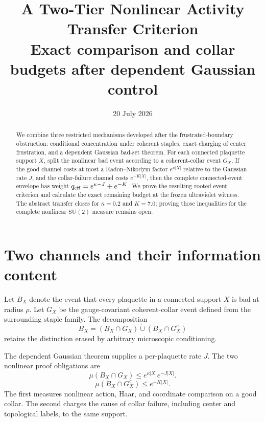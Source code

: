 \documentclass[11pt]{article}
\title{A Two-Tier Nonlinear Activity Transfer Criterion\\
\large Exact comparison and collar budgets after dependent Gaussian control}
\author{}
\date{20 July 2026}
\begin{document}
\maketitle

\begin{abstract}
We combine three restricted mechanisms developed after the frustrated-boundary
obstruction: conditional concentration under coherent staples, exact charging
of center frustration, and a dependent Gaussian bad-set theorem.  For each
connected plaquette support $X$, split the nonlinear bad event according to a
coherent-collar event $G_X$.  If the good channel costs at most a
Radon--Nikodym factor $e^{\kappa|X|}$ relative to the Gaussian rate $J$, and
the collar-failure channel costs $e^{-K|X|}$, then the complete connected-event
envelope has weight $q_{\rm eff}=e^{\kappa-J}+e^{-K}$.  We prove the resulting rooted
event criterion and calculate the exact remaining budget at the frozen
ultraviolet witness.  The abstract transfer closes for $\kappa=0.2$ and
$K=7.0$; proving those inequalities for the complete nonlinear
$\mathrm{SU}(2)$ measure remains open.
\end{abstract}

\tableofcontents

\section{Two channels and their information content}

Let $B_X$ denote the event that every plaquette in a connected support $X$ is
bad at radius $\rho$.  Let $G_X$ be the gauge-covariant coherent-collar event
defined from the surrounding staple family.  The decomposition
\[
 B_X=(B_X\cap G_X)\mathbin{\dot\cup}(B_X\cap G_X^c)
\]
retains the distinction erased by arbitrary microscopic conditioning.

The dependent Gaussian theorem supplies a per-plaquette rate $J$.  The two
nonlinear proof obligations are
\begin{equation}
 \mu(B_X\cap G_X)\leq e^{\kappa|X|}e^{-J|X|}.
 \label{eq:good}
\end{equation}
\begin{equation}
 \mu(B_X\cap G_X^c)\leq e^{-K|X|}.
 \label{eq:collar}
\end{equation}
The first measures nonlinear action, Haar, and coordinate comparison on a good
collar.  The second charges the cause of collar failure, including center and
topological labels, to the same support.
\end{document}
